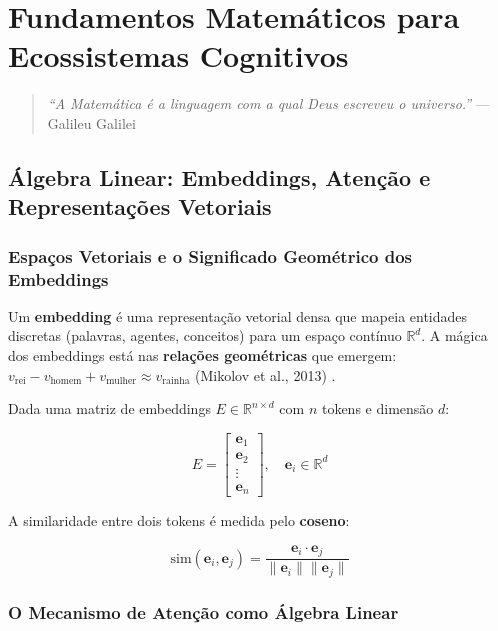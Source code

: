 \chapter{Fundamentos Matemáticos para Ecossistemas Cognitivos}

\begin{quote}
\textit{``A Matemática é a linguagem com a qual Deus escreveu o universo.''} --- Galileu Galilei
\end{quote}

\section{Álgebra Linear: Embeddings, Atenção e Representações Vetoriais}

\subsection{Espaços Vetoriais e o Significado Geométrico dos Embeddings}

Um \textbf{embedding} é uma representação vetorial densa que mapeia entidades discretas (palavras, agentes, conceitos) para um espaço contínuo $\mathbb{R}^d$. A mágica dos embeddings está nas \textbf{relações geométricas} que emergem: $v_{\text{rei}} - v_{\text{homem}} + v_{\text{mulher}} \approx v_{\text{rainha}}$ (Mikolov et al., 2013) \cite{mikolov2013efficient}.

Dada uma matriz de embeddings $E \in \mathbb{R}^{n \times d}$ com $n$ tokens e dimensão $d$:

\begin{equation}
E = \begin{bmatrix} \mathbf{e}_1 \\ \mathbf{e}_2 \\ \vdots \\ \mathbf{e}_n \end{bmatrix}, \quad \mathbf{e}_i \in \mathbb{R}^d
\label{eq:embedding_matrix}
\end{equation}

A similaridade entre dois tokens é medida pelo \textbf{coseno}:

\begin{equation}
\text{sim}(\mathbf{e}_i, \mathbf{e}_j) = \frac{\mathbf{e}_i \cdot \mathbf{e}_j}{\|\mathbf{e}_i\| \|\mathbf{e}_j\|}
\label{eq:cosine_sim}
\end{equation}

\subsection{O Mecanismo de Atenção como Álgebra Linear}

